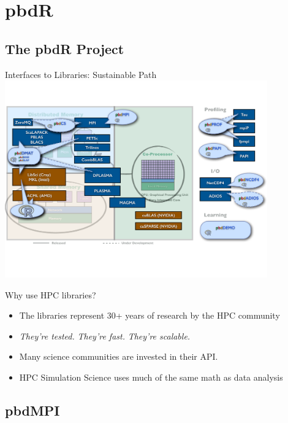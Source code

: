\section{pbdR}
\makesubcontentsslides

\subsection{The pbdR Project}
\makesubcontentsslidessec

\begin{frame}{\pbdR Interfaces to Libraries: Sustainable Path}
  \vspace{-1ex}
  \centering\includegraphics[trim=0cm 5cm 0cm 3cm,clip=true,width=0.85\textwidth]
  {../common/pics/hardware/ParallelHardware27.pdf}
  \scriptsize
  \begin{block}{Why use HPC libraries?}
    \begin{itemize}[<+-|alert@+>]
    \item The libraries represent 30+ years of research by the HPC
      community
    \item \emph{They're tested.} \emph{They're
        fast.}  \emph{They're scalable.}
    \item Many science communities are invested in their API.
    \item HPC Simulation Science uses much of the same math as data
      analysis
    \end{itemize}
  \end{block}
\end{frame}

\subsection{pbdMPI}
\makesubcontentsslidessec

